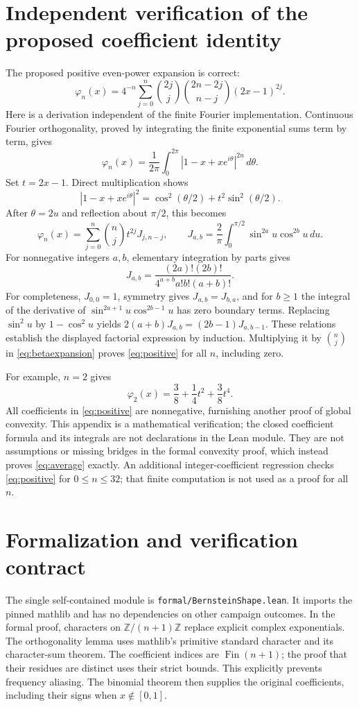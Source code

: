 \documentclass[11pt]{article}
\newcommand{\ph}{\varphi}
\begin{document}
\section{Independent verification of the proposed coefficient identity}
The proposed positive even-power expansion is correct:
\begin{equation}\label{eq:positive}
 \boxed{\displaystyle
 \ph_n(x)=4^{-n}\sum_{j=0}^n
 \binom{2j}{j}\binom{2n-2j}{n-j}(2x-1)^{2j}.}
\end{equation}
Here is a derivation independent of the finite Fourier implementation.
Continuous Fourier orthogonality, proved by integrating the finite
exponential sums term by term, gives
\[
 \ph_n(x)=\frac1{2\pi}\int_0^{2\pi}|1-x+xe^{i\theta}|^{2n}\,d\theta.
\]
Set $t=2x-1$. Direct multiplication shows
\[
 |1-x+xe^{i\theta}|^2
 =\cos^2(\theta/2)+t^2\sin^2(\theta/2).
\]
After $\theta=2u$ and reflection about $\pi/2$, this becomes
\begin{equation}\label{eq:betaexpansion}
 \ph_n(x)=\sum_{j=0}^n\binom nj t^{2j}J_{j,n-j},\qquad
 J_{a,b}=\frac2\pi\int_0^{\pi/2}\sin^{2a}u\cos^{2b}u\,du.
\end{equation}
For nonnegative integers $a,b$, elementary integration by parts gives
\[
 J_{a,b}=\frac{(2a)!(2b)!}{4^{a+b}a!b!(a+b)!}.
\]
For completeness, $J_{0,0}=1$, symmetry gives $J_{a,b}=J_{b,a}$,
and for $b\geq1$ the integral of the derivative of
$\sin^{2a+1}u\cos^{2b-1}u$ has zero boundary terms. Replacing
$\sin^2u$ by $1-\cos^2u$ yields
$2(a+b)J_{a,b}=(2b-1)J_{a,b-1}$.
These relations establish the displayed factorial expression by induction.
Multiplying it by $\binom nj$ in \eqref{eq:betaexpansion} proves
\eqref{eq:positive} for all $n$, including zero.

For example, $n=2$ gives
\[
 \ph_2(x)=\frac38+\frac14t^2+\frac38t^4.
\]
All coefficients in \eqref{eq:positive} are nonnegative, furnishing another
proof of global convexity. This appendix is a mathematical verification;
the closed coefficient formula and its integrals are not declarations in
the Lean module. They are not assumptions or missing bridges in the
formal convexity proof, which instead proves \eqref{eq:average} exactly.
An additional integer-coefficient regression checks \eqref{eq:positive}
for $0\leq n\leq32$; that finite computation is not used as a proof for all $n$.

\section{Formalization and verification contract}
The single self-contained module is \nolinkurl{formal/BernsteinShape.lean}.
It imports the pinned mathlib and has no dependencies on other campaign
outcomes. In the formal proof, characters on $\mathbb Z/(n+1)\mathbb Z$
replace explicit complex exponentials. The orthogonality lemma uses
mathlib's primitive standard character and its character-sum theorem.
The coefficient indices are $\operatorname{Fin}(n+1)$; the proof that
their residues are distinct uses their strict bounds. This explicitly
prevents frequency aliasing. The binomial theorem then supplies the
original coefficients, including their signs when $x\notin[0,1]$.
\end{document}
